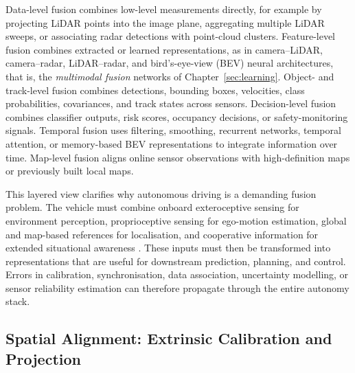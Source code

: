 Data-level fusion combines low-level measurements directly, for example by projecting LiDAR points into the image plane, aggregating multiple LiDAR sweeps, or associating radar detections with point-cloud clusters. Feature-level fusion combines extracted or learned representations, as in camera--LiDAR, camera--radar, LiDAR--radar, and bird's-eye-view (BEV) neural architectures, that is, the \emph{multimodal fusion} networks of Chapter~\ref{sec:learning}. Object- and track-level fusion combines detections, bounding boxes, velocities, class probabilities, covariances, and track states across sensors. Decision-level fusion combines classifier outputs, risk scores, occupancy decisions, or safety-monitoring signals. Temporal fusion uses filtering, smoothing, recurrent networks, temporal attention, or memory-based BEV representations to integrate information over time. Map-level fusion aligns online sensor observations with high-definition maps or previously built local maps.

This layered view clarifies why autonomous driving is a demanding fusion problem. The vehicle must combine onboard exteroceptive sensing for environment perception, proprioceptive sensing for ego-motion estimation, global and map-based references for localisation, and cooperative information for extended situational awareness \cite{2023:IEEE_ITSM,TANG2023109165}. These inputs must then be transformed into representations that are useful for downstream prediction, planning, and control. Errors in calibration, synchronisation, data association, uncertainty modelling, or sensor reliability estimation can therefore propagate through the entire autonomy stack.

\subsection{Spatial Alignment: Extrinsic Calibration and Projection}
\label{subsec:spatial-alignment}

